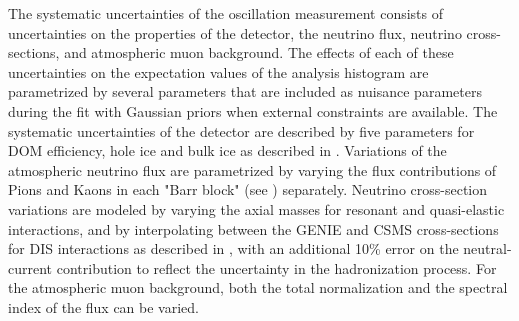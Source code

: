 The systematic uncertainties of the oscillation measurement consists of uncertainties on the properties of the detector, the neutrino flux, neutrino cross-sections, and atmospheric muon background. The effects of each of these uncertainties on the expectation values of the analysis histogram are parametrized by several parameters that are included as nuisance parameters during the fit with Gaussian priors when external constraints are available. The systematic uncertainties of the detector are described by five parameters for DOM efficiency, hole ice and bulk ice as described in . Variations of the atmospheric neutrino flux are parametrized by varying the flux contributions of Pions and Kaons in each "Barr block" (see ) separately. Neutrino cross-section variations are modeled by varying the axial masses for resonant and quasi-elastic interactions, and by interpolating between the \textsc{GENIE} and \textsc{CSMS} cross-sections for DIS interactions as described in , with an additional 10\% error on the neutral-current contribution to reflect the uncertainty in the hadronization process. For the atmospheric muon background, both the total normalization and the spectral index of the flux can be varied.

